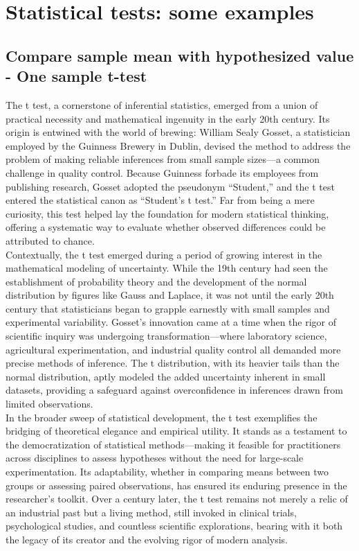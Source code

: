 \documentclass{book}
\begin{document}
\newpage

\section{Statistical tests: some examples}

\subsection{Compare sample mean with hypothesized value - One sample t-test}

The t test, a cornerstone of inferential statistics, emerged from a union of practical necessity and mathematical ingenuity in the early 20th century. Its origin is entwined with the world of brewing: William Sealy Gosset, a statistician employed by the Guinness Brewery in Dublin, devised the method to address the problem of making reliable inferences from small sample sizes—a common challenge in quality control. Because Guinness forbade its employees from publishing research, Gosset adopted the pseudonym “Student,” and the t test entered the statistical canon as “Student’s t test.” Far from being a mere curiosity, this test helped lay the foundation for modern statistical thinking, offering a systematic way to evaluate whether observed differences could be attributed to chance.\\

Contextually, the t test emerged during a period of growing interest in the mathematical modeling of uncertainty. While the 19th century had seen the establishment of probability theory and the development of the normal distribution by figures like Gauss and Laplace, it was not until the early 20th century that statisticians began to grapple earnestly with small samples and experimental variability. Gosset’s innovation came at a time when the rigor of scientific inquiry was undergoing transformation—where laboratory science, agricultural experimentation, and industrial quality control all demanded more precise methods of inference. The t distribution, with its heavier tails than the normal distribution, aptly modeled the added uncertainty inherent in small datasets, providing a safeguard against overconfidence in inferences drawn from limited observations.\\

In the broader sweep of statistical development, the t test exemplifies the bridging of theoretical elegance and empirical utility. It stands as a testament to the democratization of statistical methods—making it feasible for practitioners across disciplines to assess hypotheses without the need for large-scale experimentation. Its adaptability, whether in comparing means between two groups or assessing paired observations, has ensured its enduring presence in the researcher’s toolkit. Over a century later, the t test remains not merely a relic of an industrial past but a living method, still invoked in clinical trials, psychological studies, and countless scientific explorations, bearing with it both the legacy of its creator and the evolving rigor of modern analysis.\\
\end{document}

